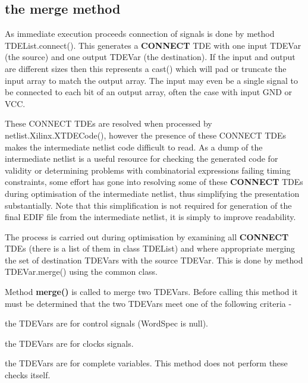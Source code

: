         
        \subsection{the merge method}
        
            As immediate execution proceeds connection of signals is done by
            method TDEList.connect(). This generates a {\bf CONNECT} TDE with one
            input TDEVar (the source) and one output TDEVar (the destination). If
            the input and output are different sizes then this represents a cast()
            which will pad or truncate the input array to match the output array.
            The input may even be a single signal to be connected to each bit of
            an output array, often the case with input GND or VCC.

            These CONNECT TDEs are resolved when processed by
            netlist.Xilinx.XTDECode(), however the presence of these CONNECT TDEs
            makes the intermediate netlist code difficult to read. As a dump of
            the intermediate netlist is a useful resource for checking the
            generated code for validity or determining problems with combinatorial
            expressions failing timing constraints, some effort has gone into
            resolving some of these {\bf CONNECT} TDEs during optimisation of the
            intermediate netlist, thus simplifying the presentation substantially.
            Note that this simplification is not required for generation of the
            final EDIF file from the intermediate netlist, it is simply to improve
            readability.

            The process is carried out during optimisation by examining all {\bf
            CONNECT} TDEs (there is a list of them in class TDEList) and where
            appropriate merging the set of destination TDEVars with the source
            TDEVar. This is done by method TDEVar.merge() using the common class.
        
            Method {\bf merge()} is called to merge two TDEVars. Before
            calling this method it must be determined that the two TDEVars
            meet one of the following criteria - 
            \blist
            \item  the TDEVars are for control signals (WordSpec is null).
            \item  the TDEVars are for clocks signals.
            \item  the TDEVars are for complete variables.
            \blend          
            This method does not perform these checks itself.
            
